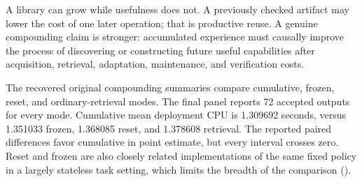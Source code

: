 A library can grow while usefulness does not. A previously checked
artifact may lower the cost of one later operation; that is productive
reuse. A genuine compounding claim is stronger: accumulated experience
must causally improve the process of discovering or constructing future
useful capabilities after acquisition, retrieval, adaptation,
maintenance, and verification costs.

The recovered original compounding summaries compare cumulative, frozen,
reset, and ordinary-retrieval modes. The final panel reports 72 accepted
outputs for every mode. Cumulative mean deployment CPU is 1.309692
seconds, versus 1.351033 frozen, 1.368085 reset, and 1.378608 retrieval.
The reported paired differences favor cumulative in point estimate, but
every interval crosses zero. Reset and frozen are also closely related
implementations of the same fixed policy in a largely stateless task
setting, which limits the breadth of the comparison
().

